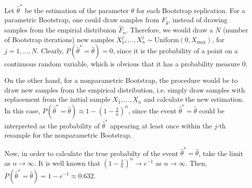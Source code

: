 \documentclass[11pt]{article}
\theoremstyle{definition}
\theoremstyle{remark}
\theoremstyle{remark}
\begin{document}
Let $\hat{\theta}^*$ be the estimation of the parameter $\theta$ for
each Bootstrap replication. For a parametric Bootstrap, one could draw
samples from $F_{\hat{\theta}}$, instead of drawing samples from the
empirial distribuion $\hat{F}_n$. Therefore, we would draw a $N$
(number of Bootstrap iterations) new samples
$X_1^j,...,X_n^j\sim\mathrm{Uniform}(0,X_{\max})$, for
$j=1,...,N$. Clearly, $P(\hat{\theta}^*=\hat{\theta})=0$, since it is
the probability of a point on a continuous random variable, which is
obvious that it has a probability measure 0.

On the other hand, for a nonparametric Bootstrap, the procedure would
be to draw new samples from the empirical distribution, i.e. simply
draw samples with replacement from the initial sample $X_1,...,X_n$
and calculate the new estimation. In this case,
$P(\hat{\theta}^*=\hat{\theta})\approx1-(1-\frac{1}{n})^n$, since the
event $\hat{\theta}^*=\hat{\theta}$ could be interpreted as the
probability of $\hat{\theta}^*$ appearing at least once within the
$j$-th resample for the nonparametric Bootstrap.

Now, in order to calculate the true probabilty of the event
$\hat{\theta}^*=\hat{\theta}$, take the limit as
$n\rightarrow\infty$. It is well known that
$(1-\frac{1}{n})^n\rightarrow e^{-1}$ as $n\rightarrow\infty$. Then,
$P(\hat{\theta}^*=\hat{\theta})=1-e^{-1}\approx0.632$.

\printbibliography
\end{document}
